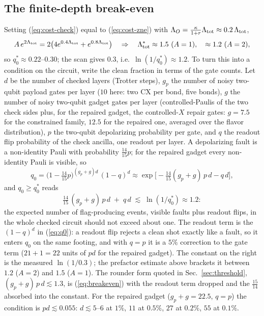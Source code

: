\documentclass[11pt,a4paper]{article}
\theoremstyle{remark}
\begin{document}
\subsection{The finite-depth break-even}

Setting (\ref{eq:cost-check}) equal to (\ref{eq:cost-zne}) with $\Lambda_O=\tfrac{\kappa}{1+r}\Lambda_{\rm tot}\approx0.2\,\Lambda_{\rm tot}$,
\begin{equation}
A\,e^{2\Lambda_{\rm tot}}=2\bigl(4e^{0.4\Lambda_{\rm tot}}+e^{0.8\Lambda_{\rm tot}}\bigr)\quad\Rightarrow\quad\Lambda_{\rm tot}^\ast\approx1.5\ (A=1),\quad\approx1.2\ (A=2),
\end{equation}
so $q_0^\ast\approx0.22$--$0.30$; the scan gives $0.3$, i.e.\ $\ln(1/q_0^\ast)\approx1.2$. To turn this into a condition on the circuit, write the clean fraction in terms of the gate counts. Let $d$ be the number of checked layers (Trotter steps), $g_p$ the number of noisy two-qubit payload gates per layer ($10$ here: two CX per bond, five bonds), $g$ the number of noisy two-qubit gadget gates per layer (controlled-Paulis of the two check sides plus, for the repaired gadget, the controlled-$X$ repair gates: $g=7.5$ for the constrained family, $12.5$ for the repaired one, averaged over the flavor distribution), $p$ the two-qubit depolarizing probability per gate, and $q$ the readout flip probability of the check ancilla, one readout per layer. A depolarizing fault is a non-identity Pauli with probability $\tfrac{14}{15}p$; for the repaired gadget every non-identity Pauli is visible, so
\begin{equation}
q_0=\bigl(1-\tfrac{14}{15}p\bigr)^{(g_p+g)d}\,(1-q)^d\approx\exp\!\bigl[-\tfrac{14}{15}(g_p+g)\,p\,d-q\,d\bigr],
\end{equation}
and $q_0\ge q_0^\ast$ reads
\begin{equation}
\tfrac{14}{15}\,(g_p+g)\,p\,d\;+\;q\,d\;\lesssim\;\ln(1/q_0^\ast)\approx1.2 :
\label{eq:breakeven}
\end{equation}
the expected number of flag-producing events, visible faults plus readout flips, in the whole checked circuit should not exceed about one. The readout term is the $(1-q)^d$ in (\ref{eq:q0}): a readout flip rejects a clean shot exactly like a fault, so it enters $q_0$ on the same footing, and with $q=p$ it is a $5\%$ correction to the gate term ($21+1=22$ units of $pd$ for the repaired gadget). The constant on the right is the measured $\ln(1/0.3)$; the prefactor estimate above brackets it between $1.2$ ($A=2$) and $1.5$ ($A=1$). The rounder form quoted in Sec.~\ref{sec:threshold}, $(g_p+g)\,p\,d\lesssim1.3$, is (\ref{eq:breakeven}) with the readout term dropped and the $\tfrac{15}{14}$ absorbed into the constant. For the repaired gadget ($g_p+g=22.5$, $q=p$) the condition is $pd\lesssim0.055$: $d\lesssim5$--$6$ at $1\%$, $11$ at $0.5\%$, $27$ at $0.2\%$, $55$ at $0.1\%$.
\end{document}
